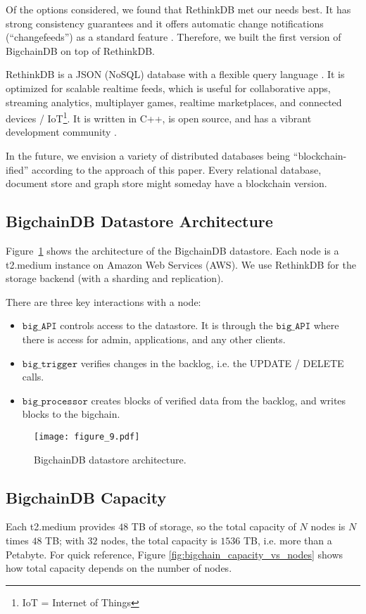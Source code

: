 Of the options considered, we found that RethinkDB met our needs best.
It has strong consistency guarantees \cite{rethinkdb_consistency} and it offers automatic change notifications (“changefeeds”) as a standard feature \cite{rethinkdb_changefeeds}.
Therefore, we built the first version of BigchainDB on top of RethinkDB.

RethinkDB is a JSON (NoSQL) database with a flexible query language \cite{rethinkdb_faq}.
It is optimized for scalable realtime feeds, which is useful for collaborative apps, streaming analytics, multiplayer games, realtime marketplaces, and connected devices / IoT\footnote{IoT = Internet of Things}.
It is written in C++, is open source, and has a vibrant development community \cite{rethinkdb_github}.

In the future, we envision a variety of distributed databases being “blockchain-ified” according to the approach of this paper.
Every relational database, document store and graph store might someday have a blockchain version.

\subsection{BigchainDB Datastore Architecture}
Figure~\ref{fig:bigchaindb_datastore_architecture} shows the architecture of the BigchainDB datastore. 
Each node is a t2.medium instance on Amazon Web Services (AWS).
We use RethinkDB for the storage backend (with a sharding and replication).

\noindent There are three key interactions with a node:
\begin{itemize}
 \item $\mathtt{big\_API}$ controls access to the datastore. It is through the $\mathtt{big\_API}$ where there is access for admin, applications, and any other clients. 
 \item $\mathtt{big\_trigger}$ verifies changes in the backlog, i.e. the UPDATE / DELETE calls. 
 \item $\mathtt{big\_processor}$ creates blocks of verified data from the backlog, and writes blocks to the bigchain.
\end{itemize}

\begin{figure}[!ht]
  \centering
  \texttt{[image: figure\_9.pdf]}
  \caption{BigchainDB datastore architecture.}
  \label{fig:bigchaindb_datastore_architecture}
\end{figure}

\subsection{BigchainDB Capacity}
Each t2.medium provides $48$ TB of storage, so the total capacity of $N$ nodes is $N$ times $48$ TB; with $32$ nodes, the total capacity is $1536$ TB, i.e. more than a Petabyte.
For quick reference, Figure \ref{fig:bigchain_capacity_vs_nodes} shows how total capacity depends on the number of nodes. 

